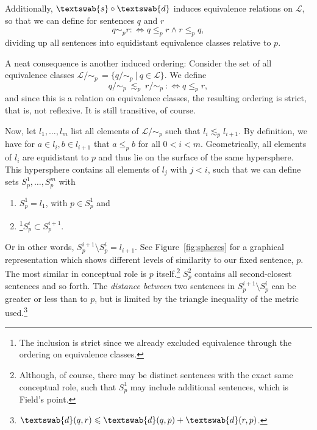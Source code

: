 \documentclass[11pt, a4paper]{scrartcl}
\renewcommand{\i}[1]{\emph{#1}}
\renewcommand{\L}{\mathcal{L}}
\newcommand{\m}[1]{\textswab{#1}}
\newcommand{\given}[1][]{\:#1\vert\:}
\begin{document}
Additionally, $\m{s}\circ \m{d}$ induces equivalence relations on $\L$, so that we can define for sentences $q$ and $r$ 
\[
    q \sim_p r :\Leftrightarrow q \leqslant_p r \land r \leqslant_p q,
\]
dividing up all sentences into equidistant equivalence classes relative to $p$.

A neat consequence is another induced ordering: Consider the set of all equivalence classes $\L/\!\sim_p\,=\{ q/\!\sim_p \given q\in \L \}$. We define   
\[
    q/\!\sim_p~\lesssim_p~r/\!\sim_p~:\Leftrightarrow q \leqslant_p r, 
\]
and since this is a relation on equivalence classes, the resulting ordering is strict, that is, not reflexive. It is still transitive, of course.

Now, let $l_1, \ldots, l_m$ list all elements of $\L/\!\sim_p$ such that $l_i \lesssim_p l_{i+1}$. By definition, we have for $a \in l_i, b \in l_{i+1}$ that $a \leqslant_p b$ for all $0 < i < m$. Geometrically, all elements of $l_i$ are equidistant to $p$ and thus lie on the surface of the same hypersphere. This hypersphere contains all elements of $l_j$ with $j < i$, such that we can define sets $S^1_p, \ldots, S^m_p$ with 
\begin{enumerate}[label = (\roman*)]
    \item $S^1_p = l_1$, with $p \in S^1_p$ and 
    \item\footnote{The inclusion is strict since we already excluded equivalence through the ordering on equivalence classes.}$S^i_p \subset S^{i+1}_p$. 
\end{enumerate}
Or in other words, $S^{i+1}_p \setminus S^{i}_p = l_{i+1}$. See Figure~\ref{fig:spheres} for a graphical representation which shows different levels of similarity to our fixed sentence, $p$. The most similar in conceptual role is $p$ itself.\footnote{Although, of course, there may be distinct sentences with the exact same conceptual role,  such that $S^1_p$ may include additional sentences, which is Field's point.} $S^2_p$ contains all second-closest sentences and so forth. The \i{distance between} two sentences in $S^{i+1}_p\setminus S^{i}_p$ can be greater or less than to $p$, but is limited by the triangle inequality of the metric used.\footnote{$\m{d}(q,r) \leqslant \m{d}(q,p) + \m{d}(r,p)$.} 
\end{document}
